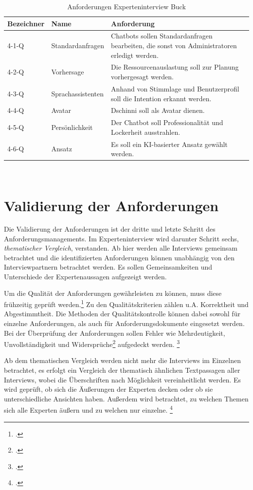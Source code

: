 \begin{table}[H]
\centering
\begin{tabularx}{1\textwidth}{l|l|X}
  Bezeichner & Name & Anforderung \\\hline
  4-1-Q & Standardanfragen & Chatbots sollen Standardanfragen bearbeiten, die sonst von Administratoren erledigt werden. \\
  4-2-Q & Vorhersage & Die Ressourcenauslastung soll zur Planung vorhergesagt werden. \\
  4-3-Q & Sprachassistenten & Anhand von Stimmlage und Benutzerprofil soll die Intention erkannt werden. \\
  4-4-Q & Avatar & Dschinni soll als Avatar dienen. \\
  4-5-Q & Persönlichkeit & Der Chatbot soll Professionalität und Lockerheit ausstrahlen. \\
  4-6-Q & Ansatz & Es soll ein KI-basierter Ansatz gewählt werden. \\
\end{tabularx}
\\\eigen
\caption{Anforderungen Experteninterview Buck}
\label{tab:expbuck}
\end{table}


\section{Validierung der Anforderungen} \label{Validierung}
Die Validierung der Anforderungen ist der dritte und letzte Schritt des Anforderungsmanagements. Im Experteninterview wird darunter Schritt sechs, \textit{thematischer Vergleich}, verstanden. Ab hier werden alle Interviews gemeinsam betrachtet und die identifizierten Anforderungen können unabhängig von den Interviewpartnern betrachtet werden. Es sollen Gemeinsamkeiten und Unterschiede der Expertenaussagen aufgezeigt werden.

Um die Qualität der Anforderungen gewährleisten zu können, muss diese frühzeitig geprüft werden.\footcite[Vgl.][4]{Pohl_2015_Requirements}
Zu den Qualitätskriterien zählen u.A. Korrektheit und Abgestimmtheit. Die Methoden der Qualitätskontrolle können dabei sowohl für einzelne Anforderungen, als auch für Anforderungsdokumente eingesetzt werden.
Bei der Überprüfung der Anforderungen sollen Fehler wie \glqq{}Mehrdeutigkeit, Unvollständigkeit und Widersprüche\grqq\footcite[][95]{Pohl_2015_Requirements} aufgedeckt werden.
\footcite[Vgl.][95]{Pohl_2015_Requirements}

Ab dem thematischen Vergleich werden nicht mehr die Interviews im Einzelnen betrachtet, es erfolgt ein Vergleich der thematisch ähnlichen Textpassagen aller Interviews, wobei die Überschriften nach Möglichkeit vereinheitlicht werden. Es wird geprüft, ob sich die Äußerungen der Experten decken oder ob sie unterschiedliche Ansichten haben. Außerdem wird betrachtet, zu welchen Themen sich alle Experten äußern und zu welchen nur einzelne.
\footcites[Vgl.][459\psq]{Meuser_1991_Interview}[Vgl.][37]{Matthes_1986}


